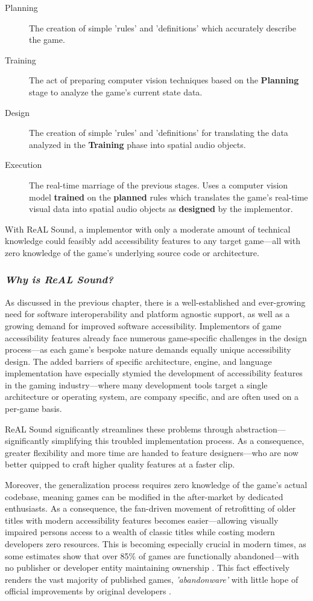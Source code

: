 \documentclass{report}
\newcommand{\rs}{ReAL Sound\xspace}
\begin{document}
\begin{description}
    \item [Planning] The creation of simple 'rules' and 'definitions' which accurately describe the game.
    \item [Training] The act of preparing computer vision techniques based on the \textbf{Planning} stage to analyze the game's current state data.
    \item [Design] The creation of simple 'rules' and 'definitions' for translating the data analyzed in the \textbf{Training} phase into spatial audio objects. 
    \item [Execution] The real-time marriage of the previous stages. Uses a computer vision model \textbf{trained} on the \textbf{planned} rules which translates the game's real-time visual data into spatial audio objects as \textbf{designed} by the implementor.    
\end{description}

With \rs, a implementor with only a moderate amount of technical knowledge  could feasibly add accessibility features to any target game---all with zero knowledge of the game's underlying source code or architecture.


\subsubsection{\emph{Why is \rs?}}
As discussed in the previous chapter, there is a well-established and ever-growing need for software interoperability and platform agnostic support, as well as a growing demand for improved software accessibility. Implementors of game accessibility features already face numerous game-specific challenges in the design process---as each game's bespoke nature demands equally unique accessibility design. The added barriers of specific architecture, engine, and language implementation have especially stymied the development of accessibility features in the gaming industry---where many development tools target a single architecture or operating system, are company specific, and are often used on a per-game basis. 

\rs significantly streamlines these problems through abstraction---significantly simplifying this troubled implementation process. As a consequence, greater flexibility and more time are handed to feature designers---who are now better quipped to craft higher quality features at a faster clip.

Moreover, the generalization process requires zero knowledge of the game's actual codebase, meaning games can be modified in the after-market by dedicated enthusiasts. As a consequence, the fan-driven movement of retrofitting of older titles with modern accessibility features becomes easier---allowing visually impaired persons access to a wealth of classic titles while costing modern developers zero resources. This is becoming especially crucial in modern times, as some estimates show that over 85\% of games are functionally abandoned---with no publisher or developer entity maintaining ownership \cite{Lewin_2023}. This fact effectively renders the vast majority of published games, \emph{'abandonware'} with little hope of official improvements by original developers \cite{Costikyan_2000}.
\end{document}
